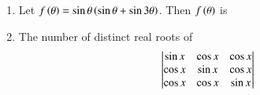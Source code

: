 \documentclass[journal,12pt,twocolumn]{IEEEtran}
\theoremstyle{remark}
\begin{document}
\begin{enumerate}
\begin{enumerate}
\begin{multicols}{2}
            \end{multicols}

        \end{enumerate}

    \item Let $f\left(\theta\right) = \sin{\theta}\left(\sin{\theta} + \sin{3\theta}\right)$. Then $f\left(\theta\right)$ is
        
        \hfill{}
        \begin{enumerate}

        \end{enumerate}

    \item The number of distinct real roots of
    \begin{align*}
	    \begin{vmatrix}
		\sin{x}&\cos{x}&\cos{x}\\
    		\cos{x}&\sin{x}&\cos{x}\\
		\cos{x}&\cos{x}&\sin{x}\end{vmatrix}
    \end{align*}

        \hfill{}
        \begin{enumerate}
        \end{enumerate}


\end{enumerate}
\end{document}
